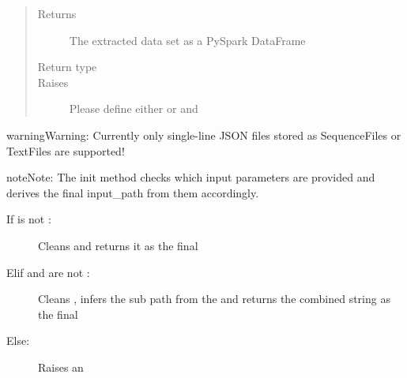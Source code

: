 \documentclass[a4paper,10pt, twoside,english]{sphinxmanual}
\begin{document}
\begin{fulllineitems}
\begin{quote}
\begin{description}
\begin{itemize}
\end{itemize}

\item[{Returns}] \leavevmode
The extracted data set as a PySpark DataFrame

\item[{Return type}] \leavevmode
{}

\item[{Raises}] \leavevmode
{} \textendash{} Please define either  or  and 

\end{description}\end{quote}

\begin{sphinxadmonition}{warning}{Warning:}
Currently only single-line JSON files stored as SequenceFiles or TextFiles are supported!
\end{sphinxadmonition}

\begin{sphinxadmonition}{note}{Note:}
The init method checks which input parameters are provided and derives the final input\_path
from them accordingly.
\begin{description}
\item[{If  is not :}] \leavevmode
Cleans  and returns it as the final 

\item[{Elif  and  are not :}] \leavevmode
Cleans , infers the sub path from the 
and returns the combined string as the final 

\item[{Else:}] \leavevmode
Raises an 

\end{description}
\end{sphinxadmonition}


\end{fulllineitems}
\end{document}
